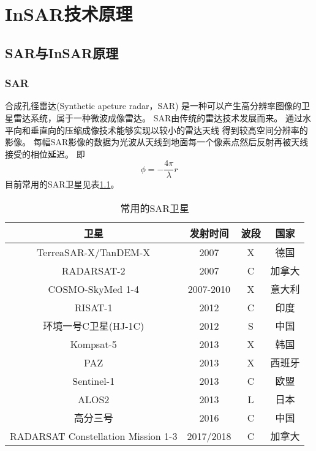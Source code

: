 \chapter{InSAR技术原理}

\section{SAR与InSAR原理}

\subsection{SAR}
合成孔径雷达(Synthetic apeture radar，SAR)
是一种可以产生高分辨率图像的卫星雷达系统，属于一种微波成像雷达。
SAR由传统的雷达技术发展而来。
通过水平向和垂直向的压缩成像技术能够实现以较小的雷达天线
得到较高空间分辨率的影像。
每幅SAR影像的数据为光波从天线到地面每一个像素点然后反射再被天线接受的相位延迟。
即
\begin{equation}
    \phi=-\frac{4\pi}{\lambda}r
\end{equation}
目前常用的SAR卫星见表\ref{tab:sarsatellite}。
\begin{table}
    \centering\small
    \begin{tabular}{@{}cccc@{}}
    \toprule
    卫星                                 & 发射时间      & 波段 & 国家  \\ \midrule
    TerreaSAR-X/TanDEM-X               & 2007      & X  & 德国  \\
    RADARSAT-2                         & 2007      & C  & 加拿大 \\
    COSMO-SkyMed 1-4                   & 2007-2010 & X  & 意大利 \\
    RISAT-1                            & 2012      & C  & 印度  \\
    环境一号C卫星(HJ-1C)                     & 2012      & S  & 中国  \\
    Kompsat-5                          & 2013      & X  & 韩国  \\
    PAZ                                & 2013      & X  & 西班牙 \\
    Sentinel-1                         & 2013      & C  & 欧盟  \\
    ALOS2                              & 2013      & L  & 日本  \\
    高分三号                               & 2016      & C  & 中国  \\
    RADARSAT Constellation Mission 1-3 & 2017/2018 & C  & 加拿大 \\ \bottomrule
    \end{tabular}
    \caption{常用的SAR卫星}
    \label{tab:sarsatellite}
\end{table}

